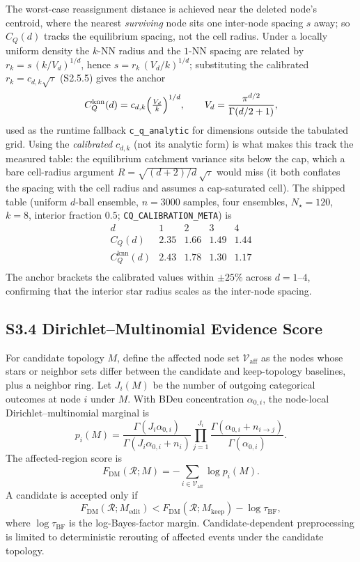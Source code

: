 \documentclass[11pt]{article}
\begin{document}
The worst-case reassignment distance is achieved near the deleted node's
centroid, where the nearest \emph{surviving} node sits one inter-node spacing
$s$ away; so $C_Q(d)$ tracks the equilibrium spacing, not the cell radius. Under
a locally uniform density the $k$-NN radius and the $1$-NN spacing are related by
$r_{k}=s\,(k/V_d)^{1/d}$, hence $s=r_{k}\,(V_d/k)^{1/d}$; substituting the
calibrated $r_{k}=c_{d,k}\sqrt\tau$ (S2.5.5) gives the anchor
\[
C_Q^{\mathrm{knn}}(d)=c_{d,k}\Bigl(\tfrac{V_d}{k}\Bigr)^{1/d},
\qquad V_d=\frac{\pi^{d/2}}{\Gamma(d/2+1)},
\label{eq:si-cq-anchor}
\]
used as the runtime fallback \texttt{c\_q\_analytic} for dimensions outside the
tabulated grid. Using the \emph{calibrated} $c_{d,k}$ (not its analytic form) is
what makes this track the measured table: the equilibrium catchment variance
sits below the cap, which a bare cell-radius argument $R=\sqrt{(d+2)/d}\,\sqrt\tau$
would miss (it both conflates the spacing with the cell radius and assumes a
cap-saturated cell). The shipped table (uniform $d$-ball ensemble, $n=3000$
samples, four ensembles, $N_\star=120$, $k=8$, interior fraction $0.5$;
\texttt{CQ\_CALIBRATION\_META}) is
\[
\begin{array}{c|cccc}
d & 1 & 2 & 3 & 4\\
\hline
C_Q(d) & 2.35 & 1.66 & 1.49 & 1.44\\
C_Q^{\mathrm{knn}}(d) & 2.43 & 1.78 & 1.30 & 1.17\\
\end{array}
\]
The anchor brackets the calibrated values within $\pm25\%$ across $d=1$--$4$,
confirming that the interior star radius scales as the inter-node spacing.

\subsection*{S3.4 Dirichlet--Multinomial Evidence Score}
\label{sec:si-dm-evidence}
For candidate topology $M$, define the affected node set $\mathcal V_{\mathrm{aff}}$ as the nodes whose stars or neighbor sets differ between the candidate and keep-topology baselines, plus a neighbor ring. Let $J_i(M)$ be the number of outgoing categorical outcomes at node $i$ under $M$. With BDeu concentration $\alpha_{0,i}$, the node-local Dirichlet--multinomial marginal is
\[
p_i(M)=
\frac{\Gamma(J_i\alpha_{0,i})}{\Gamma(J_i\alpha_{0,i}+n_i)}
\prod_{j=1}^{J_i}
\frac{\Gamma(\alpha_{0,i}+n_{i\to j})}{\Gamma(\alpha_{0,i})}.
\]
The affected-region score is
\[
F_{\mathrm{DM}}(\mathcal R;M)=-\sum_{i\in\mathcal V_{\mathrm{aff}}}\log p_i(M).
\label{eq:si-fdm}
\]
A candidate is accepted only if
\[
F_{\mathrm{DM}}(\mathcal R;M_{\mathrm{edit}})
<
F_{\mathrm{DM}}(\mathcal R;M_{\mathrm{keep}})-\log \tau_{\mathrm{BF}},
\]
where $\log \tau_{\mathrm{BF}}$ is the log-Bayes-factor margin. Candidate-dependent preprocessing is limited to deterministic rerouting of affected events under the candidate topology.
\end{document}
